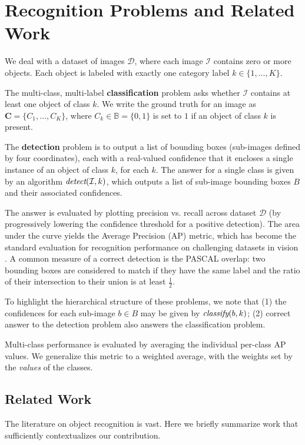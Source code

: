 \section{Recognition Problems and Related Work}

We deal with a dataset of images $\mathcal{D}$, where each image $\mathcal{I}$ contains zero or more objects.
Each object is labeled with exactly one category label $k \in \{1, \dots, K\}$.

The multi-class, multi-label \textbf{classification} problem asks whether $\mathcal{I}$ contains at least one object of class $k$.
We write the ground truth for an image as $\mathbf{C}=\{C_1,\dots,C_K\}$, where $C_k \in \mathbb{B} = \{0,1\}$ is set to $1$ if an object of class $k$ is present.

The \textbf{detection} problem is to output a list of bounding boxes (sub-images defined by four coordinates), each with a real-valued confidence that it encloses a single instance of an object of class $k$, for each $k$.
The answer for a single class is given by an algorithm $\emph{detect}(\mathcal{I},k)$, which outputs a list of sub-image bounding boxes $B$ and their associated confidences.

The answer is evaluated by plotting precision vs. recall across dataset $\mathcal{D}$ (by progressively lowering the confidence threshold for a positive detection).
The area under the curve yields the Average Precision (AP) metric, which has become the standard evaluation for recognition performance on challenging datasets in vision \cite{pascal-voc-2010}.
A common measure of a correct detection is the PASCAL overlap: two bounding boxes are considered to match if they have the same label and the ratio of their intersection to their union is at least $\frac{1}{2}$.

To highlight the hierarchical structure of these problems, we note that (1) the confidences for each sub-image $b \in B$ may be given by $\emph{classify}(b,k)$; (2) correct answer to the detection problem also answers the classification problem.

Multi-class performance is evaluated by averaging the individual per-class AP values.
We generalize this metric to a weighted average, with the weights set by the \emph{values} of the classes.

\subsection{Related Work}
The literature on object recognition is vast.
Here we briefly summarize work that sufficiently contextualizes our contribution.

